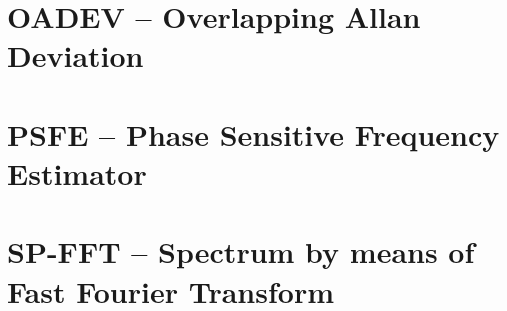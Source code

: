 \documentclass[12pt,a4paper,oneside]{report} %
\begin{document}
\chapter{OADEV -- Overlapping Allan Deviation} %
\section*{\infosection} %

\section*{\examplesection} %


\chapter{PSFE -- Phase Sensitive Frequency Estimator} %
\section*{\infosection} %

\section*{\examplesection} %


\chapter{SP-FFT -- Spectrum by means of Fast Fourier Transform} %
\section*{\infosection} %

\section*{\examplesection} %

\end{document}
